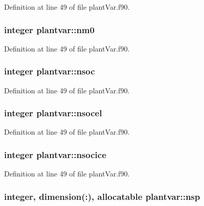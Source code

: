 Definition at line 49 of file plant\-Var.\-f90.

\hypertarget{classplantvar_a56d8f60e631d2b0dc2d7a0252a49e80e}{
\subsubsection[{nm0}]{\setlength{\rightskip}{0pt plus 5cm}integer plantvar\-::nm0}}\label{classplantvar_a56d8f60e631d2b0dc2d7a0252a49e80e}


Definition at line 49 of file plant\-Var.\-f90.

\hypertarget{classplantvar_ac56a3422e256b7cdcc55623af8ba6c7b}{
\subsubsection[{nsoc}]{\setlength{\rightskip}{0pt plus 5cm}integer plantvar\-::nsoc}}\label{classplantvar_ac56a3422e256b7cdcc55623af8ba6c7b}


Definition at line 49 of file plant\-Var.\-f90.

\hypertarget{classplantvar_a56078fb4f499089dd81db61a9e8dfc0f}{
\subsubsection[{nsocel}]{\setlength{\rightskip}{0pt plus 5cm}integer plantvar\-::nsocel}}\label{classplantvar_a56078fb4f499089dd81db61a9e8dfc0f}


Definition at line 49 of file plant\-Var.\-f90.

\hypertarget{classplantvar_a6b3064a5fca6688fa44ea9bbec34ec97}{
\subsubsection[{nsocice}]{\setlength{\rightskip}{0pt plus 5cm}integer plantvar\-::nsocice}}\label{classplantvar_a6b3064a5fca6688fa44ea9bbec34ec97}


Definition at line 49 of file plant\-Var.\-f90.

\hypertarget{classplantvar_a16e98f1a836d4de3e5436365e77441b0}{
\subsubsection[{nsp}]{\setlength{\rightskip}{0pt plus 5cm}integer, dimension(\-:), allocatable plantvar\-::nsp}}\label{classplantvar_a16e98f1a836d4de3e5436365e77441b0}


